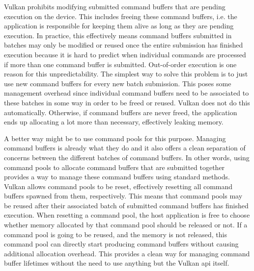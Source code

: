 
        Vulkan prohibits modifying submitted command buffers that are pending execution on the device.
        This includes freeing these command buffers, i.e. the application is responsible for keeping them alive as long as they are pending execution.
        In practice, this effectively means command buffers submitted in batches may only be modified or reused once the entire submission has finished execution because it is hard to predict when individual commands are processed if more than one command buffer is submitted.
        Out-of-order execution is one reason for this unpredictability.
        The simplest way to solve this problem is to just use new command buffers for every new batch submission.
        This poses some management overhead since individual command buffers need to be associated to these batches in some way in order to be freed or reused.
        Vulkan does not do this automatically.
        Otherwise, if command buffers are never freed, the application ends up allocating a lot more than necessary, effectively leaking memory.

        A better way might be to use command pools for this purpose.
        Managing command buffers is already what they do and it also offers a clean separation of concerns between the different batches of command buffers.
        In other words, using command pools to allocate command buffers that are submitted together provides a way to manage these command buffers using standard methods.
        Vulkan allows command pools to be reset, effectively resetting all command buffers spawned from them, respectively.
        This means that command pools may be reused after their associated batch of submitted command buffers has finished execution.
        When resetting a command pool, the host application is free to choose whether memory allocated by that command pool should be released or not.
        If a command pool is going to be reused, and the memory is not released, this command pool can directly start producing command buffers without causing additional allocation overhead.
        This provides a clean way for managing command buffer lifetimes without the need to use anything but the Vulkan \gls{api} itself.

